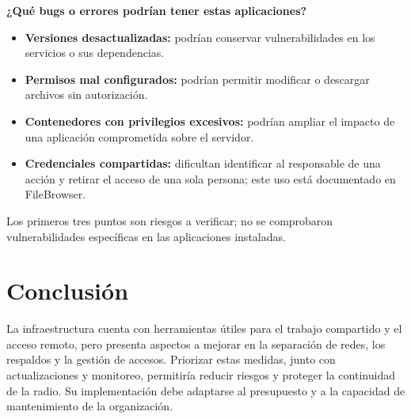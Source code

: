\documentclass[12pt,a4paper]{article}
\begin{document}
\par\textbf{¿Qué bugs o errores podrían tener estas aplicaciones?}
\begin{itemize}[itemsep=3pt]
    \item \textbf{Versiones desactualizadas:} podrían conservar vulnerabilidades en los servicios o sus dependencias.
    \item \textbf{Permisos mal configurados:} podrían permitir modificar o descargar archivos sin autorización.
    \item \textbf{Contenedores con privilegios excesivos:} podrían ampliar el impacto de una aplicación comprometida sobre el servidor.
    \item \textbf{Credenciales compartidas:} dificultan identificar al responsable de una acción y retirar el acceso de una sola persona; este uso está documentado en FileBrowser.
\end{itemize}
Los primeros tres puntos son riesgos a verificar; no se comprobaron vulnerabilidades específicas en las aplicaciones instaladas.

\clearpage
\section{Conclusión}
La infraestructura cuenta con herramientas útiles para el trabajo compartido y el acceso remoto, pero presenta aspectos a mejorar en la separación de redes, los respaldos y la gestión de accesos. Priorizar estas medidas, junto con actualizaciones y monitoreo, permitiría reducir riesgos y proteger la continuidad de la radio. Su implementación debe adaptarse al presupuesto y a la capacidad de mantenimiento de la organización.
\end{document}

